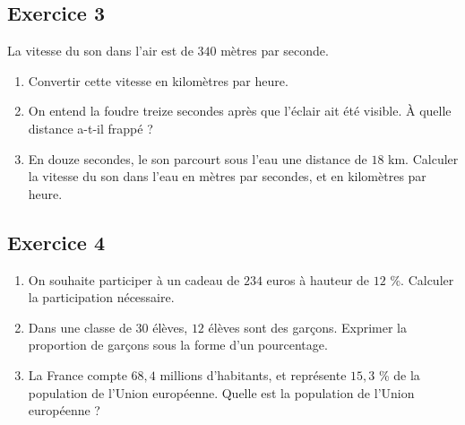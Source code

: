 \documentclass[14pt]{extreport}
\theoremstyle{plain}
\begin{document}
 
\subsection*{Exercice 3} 

La vitesse du son dans l'air est de $340$ mètres par seconde. 

\begin{enumerate}
\item Convertir cette vitesse en kilomètres par heure. 
\item On entend la foudre treize secondes après que l'éclair ait été visible. À quelle distance a-t-il frappé ? 
\item En douze secondes, le son parcourt sous l'eau une distance de $18$ km. Calculer la vitesse du son dans l'eau en mètres par secondes, et en kilomètres par heure. 


\end{enumerate}


\subsection*{Exercice 4} 

\begin{enumerate}
\item On souhaite participer à un cadeau de $234$ euros à hauteur de $12$ \%. Calculer la participation nécessaire. 
\item Dans une classe de $30$ élèves, $12$ élèves sont des garçons. Exprimer la proportion de garçons sous la forme d'un pourcentage. 
\item La France compte $68,4$ millions d'habitants, et représente $15,3$ \% de la population de l'Union européenne. Quelle est la population de l'Union européenne ? 
\end{enumerate}

 
\end{document}
